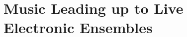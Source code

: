 \documentclass[letterpaper, 12pt]{article}
\begin{document}


\vspace*{24pt}
 
\section{Music Leading up to Live Electronic Ensembles}
\end{document}
